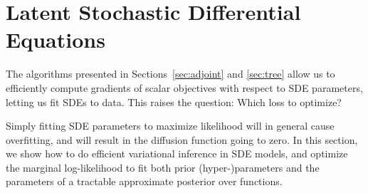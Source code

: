 \documentclass[twoside]{article}
\begin{document}
 \section{Latent Stochastic Differential Equations}
The algorithms presented in Sections~\ref{sec:adjoint} and \ref{sec:tree} allow us to efficiently compute gradients of scalar objectives with respect to SDE parameters, letting us fit SDEs to data.
This raises the question: Which loss to optimize?

Simply fitting SDE parameters to maximize likelihood will in general cause overfitting, and will result in the diffusion function going to zero.
In this section, we show how to do efficient variational inference in SDE models, and optimize the marginal log-likelihood to fit both prior (hyper-)parameters and the parameters of a tractable approximate posterior over functions.
\end{document}
